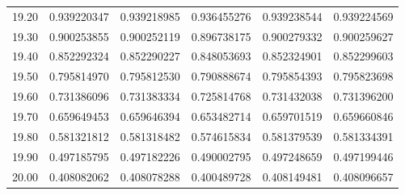 \documentclass[11pt,a4paper]{article}
\begin{document}
\begin{longtable}{rrrrrr}
19.20 & 0.939220347 & 0.939218985 & 0.936455276 & 0.939238544 & 0.939224569 \\
19.30 & 0.900253855 & 0.900252119 & 0.896738175 & 0.900279332 & 0.900259627 \\
19.40 & 0.852292324 & 0.852290227 & 0.848053693 & 0.852324901 & 0.852299603 \\
19.50 & 0.795814970 & 0.795812530 & 0.790888674 & 0.795854393 & 0.795823698 \\
19.60 & 0.731386096 & 0.731383334 & 0.725814768 & 0.731432038 & 0.731396200 \\
19.70 & 0.659649453 & 0.659646394 & 0.653482714 & 0.659701519 & 0.659660846 \\
19.80 & 0.581321812 & 0.581318482 & 0.574615834 & 0.581379539 & 0.581334391 \\
19.90 & 0.497185795 & 0.497182226 & 0.490002795 & 0.497248659 & 0.497199446 \\
20.00 & 0.408082062 & 0.408078288 & 0.400489728 & 0.408149481 & 0.408096657 \\
\end{longtable}
\endgroup
\clearpage
\end{document}
